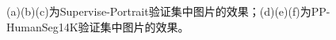 \documentclass[11pt]{article}
\begin{document}
\begin{figure}[!h]
{\begin{minipage}[t]{0.2\linewidth}
  \end{minipage}%
  }%


  \centering
  \caption{(a)(b)(c)为Supervise-Portrait验证集中图片的效果；(d)(e)(f)为PP-HumanSeg14K验证集中图片的效果。}
\label{fig:6}
\end{figure}
\end{document}
